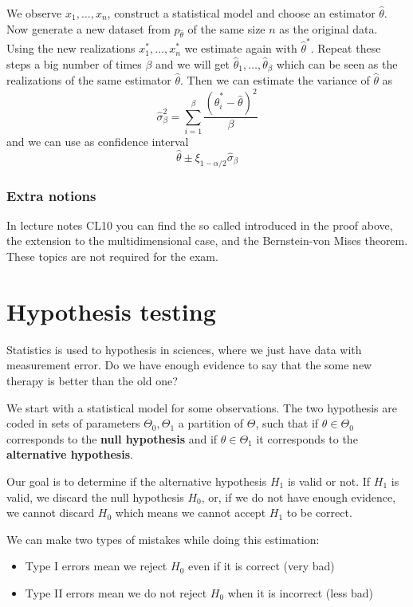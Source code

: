 \documentclass[12pt]{extarticle}
\begin{document}
We observe $x_1, \dots, x_n$, construct a statistical model and choose an estimator $\hat \theta$.
Now generate a new dataset from $p_{\hat\theta}$ of the same size $n$ as the original data.
Using the new realizations $x_1^*, \dots, x_n^*$ we estimate again with $\hat \theta^*$.
Repeat these steps a big number of times $\beta$ and we will get $\hat \theta_1, \dots, \hat \theta_\beta$ which can be seen as the realizations of the same estimator $\hat \theta$.
Then we can estimate the variance of $\hat \theta$ as
\begin{equation}
    \hat \sigma_{\beta}^2 = \sum_{i = 1}^\beta \frac{(\hat \theta_i^* - \hat \theta)^2}{\beta}
\end{equation}
and we can use as confidence interval
\begin{equation}
    \hat \theta \pm \xi_{1 - \alpha/2} \hat \sigma_\beta
\end{equation}

\subsubsection{Extra notions}

In lecture notes CL10 you can find the so called  introduced in the proof above, the extension to the multidimensional case, and the Bernstein-von Mises theorem.
These topics are not required for the exam.

\section{Hypothesis testing}

Statistics is used to  hypothesis in sciences, where we just have data with measurement error.
Do we have enough evidence to say that the some new therapy is better than the old one?

We start with a statistical model for some observations.
The two hypothesis are coded in sets of parameters $\Theta_0, \Theta_1$ a partition of $\Theta$, such that if $\theta \in \Theta_0$ corresponds to the \textbf{null hypothesis} and if $\theta \in \Theta_1$ it corresponds to the \textbf{alternative hypothesis}.

Our goal is to determine if the alternative hypothesis $H_1$ is valid or not.
If $H_1$ is valid, we discard the null hypothesis $H_0$, or, if we do not have enough evidence, we cannot discard $H_0$ which means we cannot accept $H_1$ to be correct.

We can make two types of mistakes while doing this estimation:
\begin{itemize}
    \item Type I errors mean we reject $H_0$ even if it is correct (very bad)
    \item Type II errors mean we do not reject $H_0$ when it is incorrect (less bad)
\end{itemize}
\end{document}
